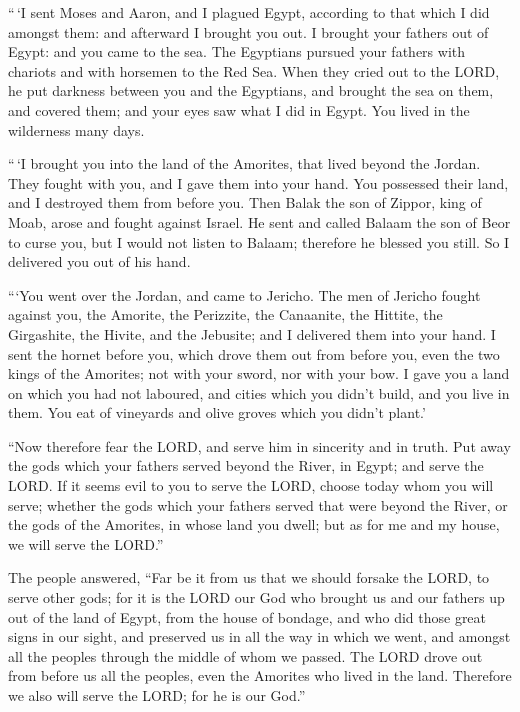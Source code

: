  ``\,`I sent Moses and Aaron, and I plagued Egypt, according
to that which I did amongst them: and afterward I brought you out.
 I brought your fathers out of Egypt: and you came to the
sea. The Egyptians pursued your fathers with chariots and with horsemen
to the Red Sea.  When they cried out to the LORD, he put
darkness between you and the Egyptians, and brought the sea on them, and
covered them; and your eyes saw what I did in Egypt. You lived in the
wilderness many days.

 ``\,`I brought you into the land of the Amorites, that
lived beyond the Jordan. They fought with you, and I gave them into your
hand. You possessed their land, and I destroyed them from before you.
 Then Balak the son of Zippor, king of Moab, arose and
fought against Israel. He sent and called Balaam the son of Beor to
curse you,  but I would not listen to Balaam; therefore he
blessed you still. So I delivered you out of his hand.

 ```You went over the Jordan, and came to Jericho. The men
of Jericho fought against you, the Amorite, the Perizzite, the
Canaanite, the Hittite, the Girgashite, the Hivite, and the Jebusite;
and I delivered them into your hand.  I sent the hornet
before you, which drove them out from before you, even the two kings of
the Amorites; not with your sword, nor with your bow.  I
gave you a land on which you had not laboured, and cities which you
didn't build, and you live in them. You eat of vineyards and olive
groves which you didn't plant.'

 ``Now therefore fear the LORD, and serve him in sincerity
and in truth. Put away the gods which your fathers served beyond the
River, in Egypt; and serve the LORD.  If it seems evil to
you to serve the LORD, choose today whom you will serve; whether the
gods which your fathers served that were beyond the River, or the gods
of the Amorites, in whose land you dwell; but as for me and my house, we
will serve the LORD.''

 The people answered, ``Far be it from us that we should
forsake the LORD, to serve other gods;  for it is the LORD
our God who brought us and our fathers up out of the land of Egypt, from
the house of bondage, and who did those great signs in our sight, and
preserved us in all the way in which we went, and amongst all the
peoples through the middle of whom we passed.  The LORD
drove out from before us all the peoples, even the Amorites who lived in
the land. Therefore we also will serve the LORD; for he is our God.''

